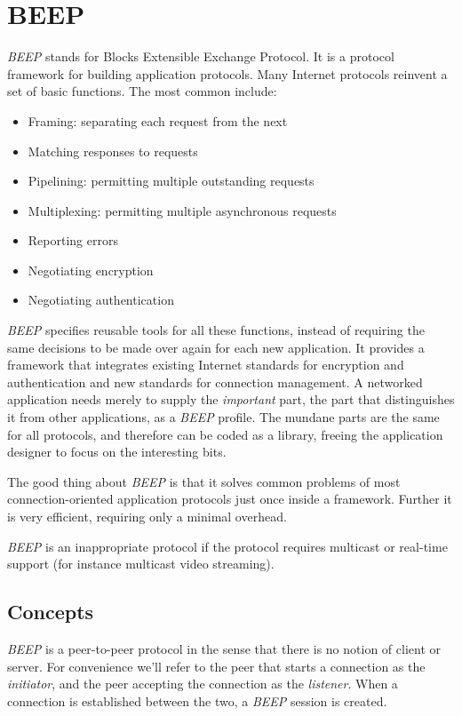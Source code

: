\section{BEEP}
\label{sect:beep}

\emph{BEEP} stands for Blocks Extensible Exchange Protocol. It is a protocol framework for building application protocols. Many Internet protocols reinvent a set of basic functions. The most common include:

\begin{itemize}
 \item Framing: separating each request from the next
 \item Matching responses to requests
 \item Pipelining: permitting multiple outstanding requests
 \item Multiplexing: permitting multiple asynchronous requests
 \item Reporting errors
 \item Negotiating encryption
 \item Negotiating authentication
\end{itemize}

\emph{BEEP} specifies reusable tools for all these functions, instead of requiring the same decisions to be made over again for each new application. It provides a framework that integrates existing Internet standards for encryption and authentication and new standards for connection management. A networked application needs merely to supply the \emph{important} part, the part that distinguishes it from other applications, as a \emph{BEEP} profile. The mundane parts are the same for all protocols, and therefore can be coded as a library, freeing the application designer to focus on the interesting bits.

The good thing about \emph{BEEP} is that it solves common problems of most connection-oriented application protocols just once inside a framework. Further it is very efficient, requiring only a minimal overhead.

\emph{BEEP} is an inappropriate protocol if the protocol requires multicast or real-time support (for instance multicast video streaming).



\subsection{Concepts}
\emph{BEEP} is a peer-to-peer protocol in the sense that there is no notion of client or server. For convenience we'll refer to the peer that starts a connection as the \emph{initiator}, and the peer accepting the connection as the \emph{listener}. When a connection is established between the two, a \emph{BEEP} session is created.

